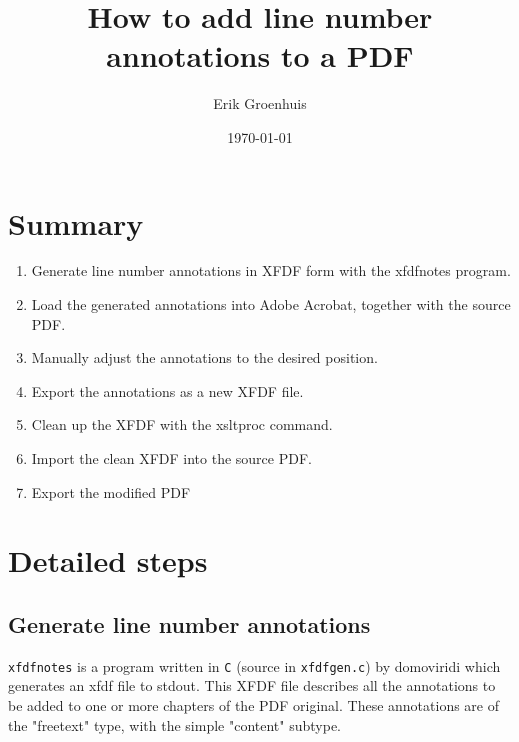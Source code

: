 \documentclass{article}
\title{How to add line number annotations to a PDF}
\author{Erik Groenhuis}
\date{\today} %
\begin{document}
\maketitle

\tableofcontents{}







\section{Summary}
\begin{enumerate}
\item Generate line number annotations in XFDF form with the xfdfnotes program.
\item Load the generated annotations into Adobe Acrobat,
 together with the source PDF.
\item Manually adjust the annotations to the desired position.
\item Export the annotations as a new XFDF file.
\item Clean up the XFDF with the xsltproc command.
\item Import the clean XFDF into the source PDF.
\item Export the modified PDF
\end{enumerate}


\section{Detailed steps}

\subsection{Generate line number annotations}
\texttt{xfdfnotes} is a program written in \texttt{C}
(source in \texttt{xfdfgen.c}) by domoviridi
which generates an xfdf file to stdout.
This XFDF file describes all the annotations to be added to one or more
chapters of the PDF original.
These annotations are of the "freetext" type,
with the simple "content" subtype.
\end{document}
